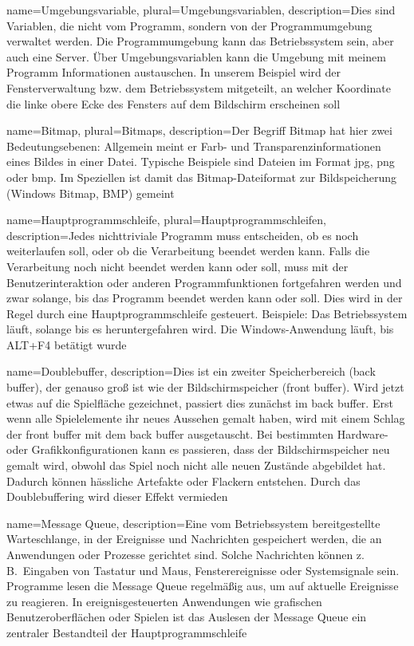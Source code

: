 {
  name={Umgebungsvariable},
  plural={Umgebungsvariablen},
  description={Dies sind Variablen, die nicht vom Programm, sondern von der Programmumgebung verwaltet werden. Die Programmumgebung kann das Betriebssystem sein, aber auch eine Server. Über Umgebungsvariablen kann die Umgebung mit meinem Programm Informationen austauschen. In unserem Beispiel wird der Fensterverwaltung bzw. dem Betriebssystem mitgeteilt, an welcher Koordinate die linke obere Ecke des Fensters auf dem Bildschirm erscheinen soll} 
}


{
  name={Bitmap},
  plural={Bitmaps},
  description={Der Begriff Bitmap hat hier zwei Bedeutungsebenen: Allgemein meint er Farb- und Transparenzinformationen eines Bildes in einer Datei. Typische Beispiele sind Dateien im Format \Gls{jpg}, \Gls{png} oder \Gls{bmp}. Im Speziellen ist damit das Bitmap-Dateiformat zur Bildspeicherung (Windows Bitmap, BMP) gemeint} 
}

{
  name={Hauptprogrammschleife},
  plural={Hauptprogrammschleifen},
  description={Jedes nichttriviale Programm muss entscheiden, ob es noch weiterlaufen soll, oder ob die Verarbeitung beendet werden kann. Falls die Verarbeitung noch nicht beendet werden kann oder soll, muss mit der Benutzerinteraktion oder anderen Programmfunktionen fortgefahren werden und zwar solange, bis das Programm beendet werden kann oder soll. Dies wird in der Regel durch eine Hauptprogrammschleife gesteuert. Beispiele: Das Betriebssystem läuft, solange bis es heruntergefahren wird. Die Windows-Anwendung läuft, bis ALT+F4 betätigt wurde} 
}

{
  name={Doublebuffer},
  description={Dies ist ein zweiter Speicherbereich (back buffer), der genauso groß ist wie der Bildschirmspeicher (front buffer). Wird jetzt etwas auf die Spielfläche gezeichnet, passiert dies zunächst im back buffer. Erst wenn alle Spielelemente ihr neues Aussehen gemalt haben, wird mit einem Schlag der front buffer mit dem back buffer ausgetauscht. Bei bestimmten Hardware- oder Grafikkonfigurationen kann es passieren, dass der Bildschirmspeicher neu gemalt wird, obwohl das Spiel noch nicht alle neuen Zustände abgebildet hat. Dadurch können hässliche Artefakte oder Flackern entstehen. Durch das Doublebuffering wird dieser Effekt vermieden} 
}

{
  name={Message Queue},
  description={Eine vom Betriebssystem bereitgestellte Warteschlange, in der Ereignisse und Nachrichten gespeichert werden, die an Anwendungen oder Prozesse gerichtet sind. Solche Nachrichten können z.\,B.\ Eingaben von Tastatur und Maus, Fensterereignisse oder Systemsignale sein. Programme lesen die Message Queue regelmäßig aus, um auf aktuelle Ereignisse zu reagieren. In ereignisgesteuerten Anwendungen wie grafischen Benutzeroberflächen oder Spielen ist das Auslesen der Message Queue ein zentraler Bestandteil der Hauptprogrammschleife} 
}

